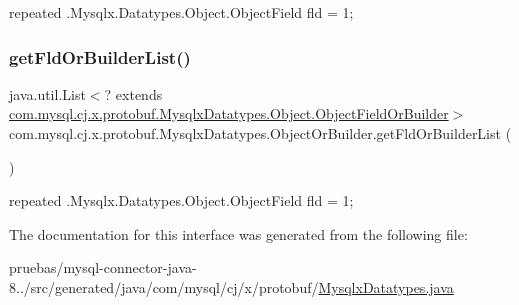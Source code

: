 {\ttfamily repeated .Mysqlx.\+Datatypes.\+Object.\+Object\+Field fld = 1;} \mbox{\label{interfacecom_1_1mysql_1_1cj_1_1x_1_1protobuf_1_1_mysqlx_datatypes_1_1_object_or_builder_a875d79fe453aa509490efd21f9b9edb8}} 
\subsubsection{\texorpdfstring{get\+Fld\+Or\+Builder\+List()}{getFldOrBuilderList()}}
{\footnotesize\ttfamily java.\+util.\+List$<$? extends \mbox{\hyperlink{interfacecom_1_1mysql_1_1cj_1_1x_1_1protobuf_1_1_mysqlx_datatypes_1_1_object_1_1_object_field_or_builder}{com.\+mysql.\+cj.\+x.\+protobuf.\+Mysqlx\+Datatypes.\+Object.\+Object\+Field\+Or\+Builder}}$>$ com.\+mysql.\+cj.\+x.\+protobuf.\+Mysqlx\+Datatypes.\+Object\+Or\+Builder.\+get\+Fld\+Or\+Builder\+List (\begin{DoxyParamCaption}{ }\end{DoxyParamCaption})}

{\ttfamily repeated .Mysqlx.\+Datatypes.\+Object.\+Object\+Field fld = 1;} 

The documentation for this interface was generated from the following file\+:\begin{DoxyCompactItemize}
\item 
pruebas/mysql-\/connector-\/java-\/8../src/generated/java/com/mysql/cj/x/protobuf/\mbox{\hyperlink{_mysqlx_datatypes_8java}{Mysqlx\+Datatypes.\+java}}\end{DoxyCompactItemize}

